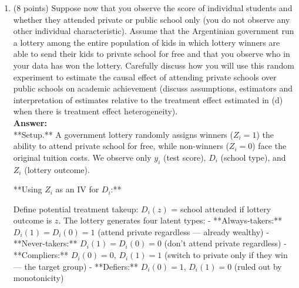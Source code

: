 \documentclass[letterpaper,12pt]{article}
\begin{document}
\begin{enumerate}[label=(\alph*)]
$$\underbrace{\bar{y}_{D=1} - \bar{y}_{D=0}}_{\hat{\beta}_1} = \underbrace{ATE}_{\text{causal}} + \underbrace{\mathbb{E}[y(0)\mid D=1] - \mathbb{E}[y(0)\mid D=0]}_{\text{Selection Bias}} + \underbrace{(ATT - ATE) \cdot P(D=0)}_{\text{Heterogeneous TE Bias}}$$

**Selection Bias:**:

$$\mathbb{E}[y(0)\mid D=1] = \frac{80.25(140) + 79.5(56) + 70.0(50) + 69.8(25)}{271} = \frac{20{,}932}{271} \approx 77.24$$

$$\mathbb{E}[y(0)\mid D=0] = \bar{y}_{public} \approx 72.60$$

$$\boxed{\text{Selection Bias} = 77.24 - 72.60 = 4.64}$$


**ATT from counterfactual data:**

$$ATT = \bar{y}_{D=1} - \mathbb{E}[y(0)\mid D=1] = 84.45 - 77.24 = 7.21$$
To calculate $ATU$, we use $$ATE=\Pi \times ATT+(1-\Pi) \times ATU \Rightarrow ATU=6.6$$

$$\boxed{\text{Heterogeneous TE Bias} =P(D=0) \times ( ATT - ATE) = \frac{202}{473} (7.21 - 6.6) = 0.26}$$
\item (8 points) Suppose now that you observe the score of individual students and whether they attended private or public school only (you do not observe any other individual characteristic). Assume that the Argentinian government run a lottery among the entire population of kids in which lottery winners are able to send their kids to private school for free and that you observe who in your data has won the lottery. Carefully discuss how you will use this random experiment to estimate the causal effect of attending private schools over public schools on academic achievement (discuss assumptions, estimators and interpretation of estimates relative to the treatment effect estimated in (d) when there is treatment effect heterogeneity). \\
\textbf{Answer:}\\

**Setup.** A government lottery randomly assigns winners ($Z_i = 1$) the ability to attend private school for free, while non-winners ($Z_i = 0$) face the original tuition costs. We observe only $y_i$ (test score), $D_i$ (school type), and $Z_i$ (lottery outcome).

**Using $Z_i$ as an IV for $D_i$:**

Define potential treatment takeup: $D_i(z)$ = school attended if lottery outcome is $z$. The lottery generates four latent types:
- **Always-takers:** $D_i(1) = D_i(0) = 1$ (attend private regardless — already wealthy)
- **Never-takers:** $D_i(1) = D_i(0) = 0$ (don't attend private regardless)
- **Compliers:** $D_i(0) = 0$, $D_i(1) = 1$ (switch to private only if they win — the target group)
- **Defiers:** $D_i(0) = 1$, $D_i(1) = 0$ (ruled out by monotonicity)


\end{enumerate}
\end{document}

